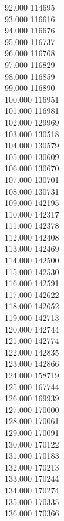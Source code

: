 { 92.000	114695 \\
 93.000	116616 \\
 94.000	116676 \\
 95.000	116737 \\
 96.000	116768 \\
 97.000	116829 \\
 98.000	116859 \\
 99.000	116890 \\
 100.000	116951 \\
 101.000	116981 \\
 102.000	129969 \\
 103.000	130518 \\
 104.000	130579 \\
 105.000	130609 \\
 106.000	130670 \\
 107.000	130701 \\
 108.000	130731 \\
 109.000	142195 \\
 110.000	142317 \\
 111.000	142378 \\
 112.000	142408 \\
 113.000	142469 \\
 114.000	142500 \\
 115.000	142530 \\
 116.000	142591 \\
 117.000	142622 \\
 118.000	142652 \\
 119.000	142713 \\
 120.000	142744 \\
 121.000	142774 \\
 122.000	142835 \\
 123.000	142866 \\
 124.000	158719 \\
 125.000	167744 \\
 126.000	169939 \\
 127.000	170000 \\
 128.000	170061 \\
 129.000	170091 \\
 130.000	170122 \\
 131.000	170183 \\
 132.000	170213 \\
 133.000	170244 \\
 134.000	170274 \\
 135.000	170335 \\
 136.000	170366 \\
}
